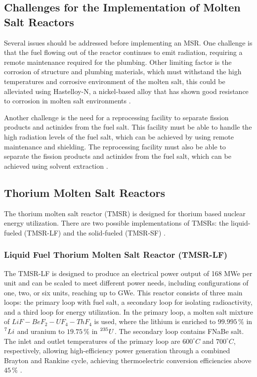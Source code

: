 \subsection{Challenges for the Implementation of Molten Salt Reactors}

Several issues should be addressed before implementing an MSR. One challenge is that the fuel flowing out of the reactor continues to emit radiation, requiring a remote maintenance required for the plumbing. Other limiting factor is the corrosion of structure and plumbing materials, which must withstand the high temperatures and corrosive environment of the molten salt, this could be alleviated using Hastelloy-N, a nickel-based alloy that has shown good resistance to corrosion in molten salt environments \cite{TMSR_book,Haynes2024}.

Another challenge is the need for a reprocessing facility to separate fission products and actinides from the fuel salt. This facility must be able to handle the high radiation levels of the fuel salt, which can be achieved by using remote maintenance and shielding. The reprocessing facility must also be able to separate the fission products and actinides from the fuel salt, which can be achieved using solvent extraction \cite{TMSR_book}.

\subsection{Thorium Molten Salt Reactors}

The thorium molten salt reactor (TMSR) is designed for thorium based nuclear energy utilization. There are two possible implementations of TMSRs: the liquid-fueled (TMSR-LF) and the solid-fueled (TMSR-SF) \cite{TMSR_book}.

\subsubsection{Liquid Fuel Thorium Molten Salt Reactor (TMSR-LF)}

The TMSR-LF is designed to produce an electrical power output of 168 MWe per unit and can be scaled to meet different power needs, including configurations of one, two, or six units, reaching up to GWe. This reactor consists of three main loops: the primary loop with fuel salt, a secondary loop for isolating radioactivity, and a third loop for energy utilization. In the primary loop, a molten salt mixture of \(LiF-BeF_2-UF_4-ThF_4\) is used, where the lithium is enriched to \(99.995 \, \%\) in \(\prescript{7}{}{Li}\) and uranium to \(19.75 \, \%\) in \(\prescript{235}{}{U}\). The secondary loop contains FNaBe salt. The inlet and outlet temperatures of the primary loop are \(600^{\circ}C\) and \(700^{\circ}C\), respectively, allowing high-efficiency power generation through a combined Brayton and Rankine cycle, achieving thermoelectric conversion efficiencies above \(45 \, \%\) \cite{TMSR_book}.

